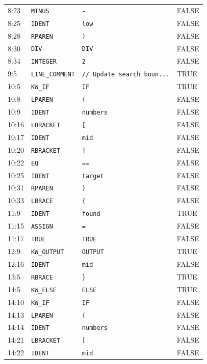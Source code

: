 \documentclass[11pt,a4paper]{article}
\newcommand{\token}[1]{\texttt{#1}}
\newcommand{\codeinline}[1]{\texttt{#1}}
\begin{document}
\begin{longtable}{L{23mm} L{42mm} L{47mm} L{32mm}}
8:23 & \token{MINUS} & \codeinline{-} & FALSE \\
8:25 & \token{IDENT} & \codeinline{low} & FALSE \\
8:28 & \token{RPAREN} & \codeinline{)} & FALSE \\
8:30 & \token{DIV} & \codeinline{DIV} & FALSE \\
8:34 & \token{INTEGER} & \codeinline{2} & FALSE \\
9:5 & \token{LINE\_COMMENT} & \codeinline{// Update search boun...} & TRUE \\
10:5 & \token{KW\_IF} & \codeinline{IF} & TRUE \\
10:8 & \token{LPAREN} & \codeinline{(} & FALSE \\
10:9 & \token{IDENT} & \codeinline{numbers} & FALSE \\
10:16 & \token{LBRACKET} & \codeinline{[} & FALSE \\
10:17 & \token{IDENT} & \codeinline{mid} & FALSE \\
10:20 & \token{RBRACKET} & \codeinline{]} & FALSE \\
10:22 & \token{EQ} & \codeinline{==} & FALSE \\
10:25 & \token{IDENT} & \codeinline{target} & FALSE \\
10:31 & \token{RPAREN} & \codeinline{)} & FALSE \\
10:33 & \token{LBRACE} & \codeinline{\{} & FALSE \\
11:9 & \token{IDENT} & \codeinline{found} & TRUE \\
11:15 & \token{ASSIGN} & \codeinline{=} & FALSE \\
11:17 & \token{TRUE} & \codeinline{TRUE} & FALSE \\
12:9 & \token{KW\_OUTPUT} & \codeinline{OUTPUT} & TRUE \\
12:16 & \token{IDENT} & \codeinline{mid} & FALSE \\
13:5 & \token{RBRACE} & \codeinline{\}} & TRUE \\
14:5 & \token{KW\_ELSE} & \codeinline{ELSE} & TRUE \\
14:10 & \token{KW\_IF} & \codeinline{IF} & FALSE \\
14:13 & \token{LPAREN} & \codeinline{(} & FALSE \\
14:14 & \token{IDENT} & \codeinline{numbers} & FALSE \\
14:21 & \token{LBRACKET} & \codeinline{[} & FALSE \\
14:22 & \token{IDENT} & \codeinline{mid} & FALSE \\

\end{longtable}
\end{document}
